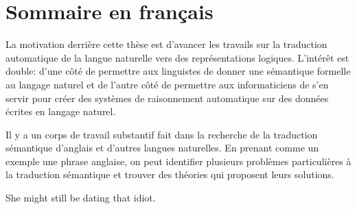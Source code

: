 \chapter*{Sommaire en français}
\label{chap:french-summary}

La motivation derrière cette thèse est d'avancer les travails sur la traduction
automatique de la langue naturelle vers des représentations logiques. L'intérêt
est double: d'une côté de permettre aux linguistes de donner une sémantique
formelle au langage naturel et de l'autre côté de permettre aux informaticiens
de s'en servir pour créer des systèmes de raisonnement automatique sur des
données écrites en langage naturel.

Il y a un corps de travail substantif fait dans la recherche de la traduction
sémantique d'anglais et d'autres langues naturelles. En prenant comme un exemple
une phrase anglaise, on peut identifier plusieurs problèmes particulières à la
traduction sémantique et trouver des théories qui proposent leurs solutions.

\begin{exe}
   She might still be dating that idiot.
\end{exe}

